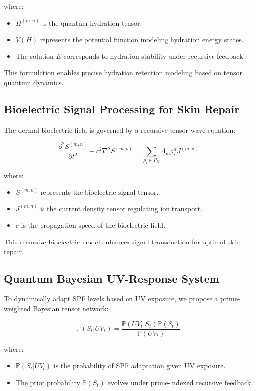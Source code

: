 \documentclass{article}
\theoremstyle{plain}
\theoremstyle{claimstyle}
\begin{document}
where:
\begin{itemize}
    \item $H^{(m,n)}$ is the quantum hydration tensor.
    \item $V(H)$ represents the potential function modeling hydration energy states.
    \item The solution $E$ corresponds to hydration stability under recursive feedback.
\end{itemize}

This formulation enables precise hydration retention modeling based on tensor quantum dynamics.

\subsection{Bioelectric Signal Processing for Skin Repair}
The dermal bioelectric field is governed by a recursive tensor wave equation:

\begin{equation}
\frac{\partial^2 S^{(m,n)}}{\partial t^2} - c^2 \nabla^2 S^{(m,n)} = \sum_{p_i \in P_N} \Lambda_m p_i^{\alpha} J^{(m,n)}
\end{equation}

where:
\begin{itemize}
    \item $S^{(m,n)}$ represents the bioelectric signal tensor.
    \item $J^{(m,n)}$ is the current density tensor regulating ion transport.
    \item $c$ is the propagation speed of the bioelectric field.
\end{itemize}

This recursive bioelectric model enhances signal transduction for optimal skin repair.

\subsection{Quantum Bayesian UV-Response System}
To dynamically adapt SPF levels based on UV exposure, we propose a prime-weighted Bayesian tensor network:

\begin{equation}
\mathbb{P} \left( S_t | UV_t \right) = \frac{\mathbb{P}(UV_t | S_t) \mathbb{P}(S_t)}{\mathbb{P}(UV_t)}
\end{equation}

where:
\begin{itemize}
    \item $\mathbb{P}(S_t | UV_t)$ is the probability of SPF adaptation given UV exposure.
    \item The prior probability $\mathbb{P}(S_t)$ evolves under prime-indexed recursive feedback.
\end{itemize}
\end{document}
